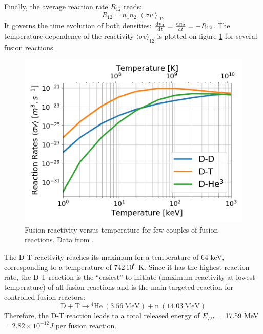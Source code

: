 Finally, the average reaction rate $R_{12}$ reads:
\begin{equation*}
	R_{12} = n_1 n_2 \; \left < \sigma v \right >_{12}
\end{equation*}
It governs the time evolution of both densities: $\dv{n_1}{t} = \dv{n_2}{t} = - R_{12}$. The temperature dependence of the reactivity $\langle \sigma v \rangle_{12}$ is plotted on figure \ref{fig:chap1:reactivity} for several fusion reactions.

\begin{figure} 
	\begin{center}
		\includegraphics[width=1.0\textwidth]{figures/chap1/Fusion_Reactivity.png}
		\caption{Fusion reactivity versus temperature for few couples of fusion reactions. Data from .}
		\label{fig:chap1:reactivity}
	\end{center}
\end{figure}

The D-T reactivity reaches its maximum for a temperature of 64 keV, corresponding to a temperature of $742\,10^6$ K. Since it has the highest reaction rate, the D-T reaction is the “easiest” to initiate (maximum reactivity at lowest temperature) of all fusion reactions and is the main targeted reaction for controlled fusion reactors: 
\begin{equation}
	\mathrm{D + T} \longrightarrow \mathrm{{}^4 He~(3.56~MeV) + n~(14.03~MeV)}
\end{equation}
Therefore, the D-T reaction leads to a total released energy of $E_{DT}$ = 17.59 \si{MeV} = $2.82\times 10^{-12} \si{J}$ per fusion reaction.


